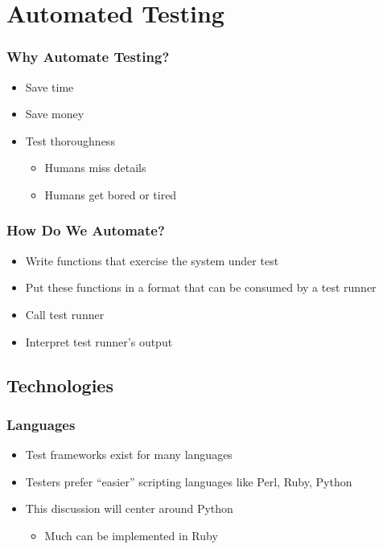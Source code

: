 \section{Automated Testing}

\begin{frame}
  \frametitle{Why Automate Testing?}
  \begin{itemize}
    \item Save time
    \item Save money
    \item Test thoroughness
    \begin{itemize}
      \item Humans miss details
      \item Humans get bored or tired
    \end{itemize}
  \end{itemize}
\end{frame}

\begin{frame}
  \frametitle{How Do We Automate?}
  \begin{itemize}
    \item Write functions that exercise the system under test
    \item Put these functions in a format that can be consumed by a test runner
    \item Call test runner
    \item Interpret test runner's output
  \end{itemize}
\end{frame}

\subsection{Technologies}

\begin{frame}
  \frametitle{Languages}
  \begin{itemize}
    \item Test frameworks exist for many languages
    \item Testers prefer ``easier'' scripting languages like Perl, Ruby, Python
    \item This discussion will center around Python
    \begin{itemize}
      \item Much can be implemented in Ruby
    \end{itemize}
  \end{itemize}
\end{frame}

